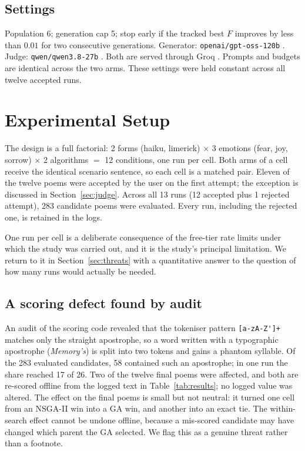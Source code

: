 \documentclass[conference]{IEEEtran}
\begin{document}
\subsection{Settings}
Population 6; generation cap 5; stop early if the tracked best $F$ improves by
less than $0.01$ for two consecutive generations. Generator:
\texttt{openai/gpt-oss-120b} \cite{openai2025gptoss}. Judge:
\texttt{qwen/qwen3.8-27b} \cite{qwen2026}. Both are served through Groq
\cite{groqdocs}. Prompts and budgets are identical across the two
arms. These settings were held constant across all twelve accepted runs.

\section{Experimental Setup}
The design is a full factorial: 2 forms (haiku, limerick) $\times$ 3 emotions
(fear, joy, sorrow) $\times$ 2 algorithms $=$ 12 conditions, one run per cell.
Both arms of a cell receive the identical scenario sentence, so each cell is a
matched pair. Eleven of the twelve poems were accepted by the user on the first
attempt; the exception is discussed in Section~\ref{sec:judge}. Across all 13
runs (12 accepted plus 1 rejected attempt), 283 candidate poems were evaluated.
Every run, including the rejected one, is retained in the logs.

One run per cell is a deliberate consequence of the free-tier rate limits under
which the study was carried out, and it is the study's principal limitation. We
return to it in Section~\ref{sec:threats} with a quantitative answer to the
question of how many runs would actually be needed.

\subsection{A scoring defect found by audit}
An audit of the scoring code revealed that the tokeniser pattern
\verb|[a-zA-Z']+| matches only the straight apostrophe, so a word written with a
typographic apostrophe (\textit{Memory's}) is split into two tokens and gains a
phantom syllable. Of the 283 evaluated candidates, 58 contained such an
apostrophe; in one run the share reached 17 of 26. Two of the twelve final poems
were affected, and both are re-scored offline from the logged text in
Table~\ref{tab:results}; no logged value was altered. The effect on the final
poems is small but not neutral: it turned one cell from an NSGA-II win into a GA
win, and another into an exact tie. The within-search effect cannot be undone
offline, because a mis-scored candidate may have changed which parent the GA
selected. We flag this as a genuine threat rather than a footnote.
\end{document}
